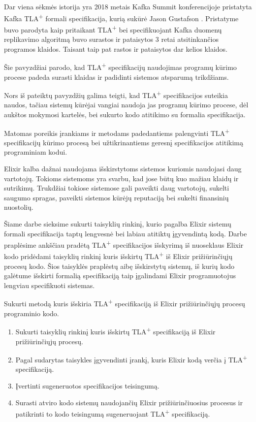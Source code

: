 \documentclass{VUMIFPSmagistrinis}
\begin{document}
		Dar viena sėkmės istorija yra 2018 metais Kafka Summit konferencijoje pristatyta Kafka TLA\textsuperscript{+} formali specifikacija, kurią sukūrė Jason Gustafson \cite{kfkTla}.
		Pristatyme buvo parodyta kaip pritaikant TLA\textsuperscript{+} bei specifikuojant Kafka duomenų replikavimo algoritmą buvo surastos ir pataisytos 3 retai atsitinkančios programos klaidos.
		Taisant taip pat rastos ir pataisytos dar kelios klaidos.

        Šie pavyzdžiai parodo, kad TLA\textsuperscript{+} specifikacijų naudojimas programų kūrimo procese padeda surasti klaidas ir padidinti sistemos atsparumą trikdžiams.

        Nors iš pateiktų pavyzdžių galima teigti, kad TLA\textsuperscript{+} specifikacijos suteikia naudos, tačiau sistemų kūrėjai vangiai naudoja jas programų kūrimo procese, dėl aukštos mokymosi
        kartelės, bei sukurto kodo atitikimo su formalia specifikacija.

        Matomas poreikis įrankiams ir metodams padedantiems palengvinti TLA\textsuperscript{+} specifikacijų kūrimo procesą bei užtikrinantiems geresnį specifikacijos atitikimą programiniam kodui. 

        Elixir kalba dažnai naudojama išskirstytoms sistemos \cite{expop} kuriomis naudojasi daug vartotojų. 
        Tokioms sistemoms yra svarbu, kad jose būtų kuo mažiau klaidų ir sutrikimų.
        Trukdžiai tokiose sistemose gali paveikti daug vartotojų, sukelti saugumo spragas, paveikti sistemos kūrėjų reputaciją bei sukelti finansinių nuostolių.

        Šiame darbe sieksime sukurti taisyklių rinkinį, kurio pagalba Elixir sistemų formali specifikacija taptų lengvesnė bei labiau atitiktų įgyvendintą kodą.
        Darbe praplėsime ankščiau pradėtą TLA\textsuperscript{+} specifikacijos išskyrimą iš nuoseklaus Elixir kodo pridėdami taisyklių rinkinį kuris išskirtų TLA\textsuperscript{+} iš Elixir prižiūrinčiųjų procesų kodo. 
        Šios taisyklės praplėstų aibę išskirstytų sistemų, iš kurių kodo galėtume išskirti formalią specifikaciją taip įgalindami Elixir programuotojus lengviau specifikuoti sistemas.

		Sukurti metodą kuris išskiria TLA\textsuperscript{+} specifikaciją iš Elixir prižiūrinčiųjų procesų programinio kodo.

	
		\begin{enumerate}
			\item{Sukurti taisyklių rinkinį kuris išskirtų TLA\textsuperscript{+} specifikaciją iš Elixir prižiūrinčiųjų procesų.}
			\item{Pagal sudarytas taisykles įgyvendinti įrankį, kuris Elixir kodą verčia į TLA\textsuperscript{+} specifikaciją.}
			\item{Įvertinti sugeneruotos specifikacijos teisingumą.}
			\item{Surasti atviro kodo sistemų naudojančių Elixir prižiūrinčiuosius procesus ir patikrinti to kodo teisingumą sugeneruojant TLA\textsuperscript{+} specifikaciją.}
		\end{enumerate}
	
\end{document}
